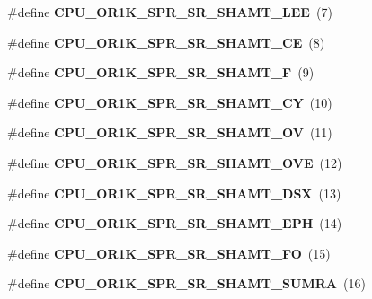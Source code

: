 \begin{DoxyCompactItemize}
\#define {\bfseries C\+P\+U\+\_\+\+O\+R1\+K\+\_\+\+S\+P\+R\+\_\+\+S\+R\+\_\+\+S\+H\+A\+M\+T\+\_\+\+L\+EE}~(7)
\item 
\mbox{\label{or1k-utility_8h_a383cb70f5643a332be297b05dc34d041}} 
\#define {\bfseries C\+P\+U\+\_\+\+O\+R1\+K\+\_\+\+S\+P\+R\+\_\+\+S\+R\+\_\+\+S\+H\+A\+M\+T\+\_\+\+CE}~(8)
\item 
\mbox{\label{or1k-utility_8h_af4cde7c50237c9bd811ee879953b9759}} 
\#define {\bfseries C\+P\+U\+\_\+\+O\+R1\+K\+\_\+\+S\+P\+R\+\_\+\+S\+R\+\_\+\+S\+H\+A\+M\+T\+\_\+F}~(9)
\item 
\mbox{\label{or1k-utility_8h_a6c9850dc198d217445889fd99e8f3266}} 
\#define {\bfseries C\+P\+U\+\_\+\+O\+R1\+K\+\_\+\+S\+P\+R\+\_\+\+S\+R\+\_\+\+S\+H\+A\+M\+T\+\_\+\+CY}~(10)
\item 
\mbox{\label{or1k-utility_8h_a50f0df27c96330e518e2f1b2c12f44cf}} 
\#define {\bfseries C\+P\+U\+\_\+\+O\+R1\+K\+\_\+\+S\+P\+R\+\_\+\+S\+R\+\_\+\+S\+H\+A\+M\+T\+\_\+\+OV}~(11)
\item 
\mbox{\label{or1k-utility_8h_ac82d1f48d24ea4b52eaa2c2a3070f323}} 
\#define {\bfseries C\+P\+U\+\_\+\+O\+R1\+K\+\_\+\+S\+P\+R\+\_\+\+S\+R\+\_\+\+S\+H\+A\+M\+T\+\_\+\+O\+VE}~(12)
\item 
\mbox{\label{or1k-utility_8h_aebf1e62073d6e7a27c5bfdbada008488}} 
\#define {\bfseries C\+P\+U\+\_\+\+O\+R1\+K\+\_\+\+S\+P\+R\+\_\+\+S\+R\+\_\+\+S\+H\+A\+M\+T\+\_\+\+D\+SX}~(13)
\item 
\mbox{\label{or1k-utility_8h_ab523fbcc519975e6f398da9c19e47de8}} 
\#define {\bfseries C\+P\+U\+\_\+\+O\+R1\+K\+\_\+\+S\+P\+R\+\_\+\+S\+R\+\_\+\+S\+H\+A\+M\+T\+\_\+\+E\+PH}~(14)
\item 
\mbox{\label{or1k-utility_8h_a115f06beb59a03448d8bb7b6a99ee531}} 
\#define {\bfseries C\+P\+U\+\_\+\+O\+R1\+K\+\_\+\+S\+P\+R\+\_\+\+S\+R\+\_\+\+S\+H\+A\+M\+T\+\_\+\+FO}~(15)
\item 
\mbox{\label{or1k-utility_8h_a0662e71ed0b051d7ca8bab70abe28094}} 
\#define {\bfseries C\+P\+U\+\_\+\+O\+R1\+K\+\_\+\+S\+P\+R\+\_\+\+S\+R\+\_\+\+S\+H\+A\+M\+T\+\_\+\+S\+U\+M\+RA}~(16)

\end{DoxyCompactItemize}
